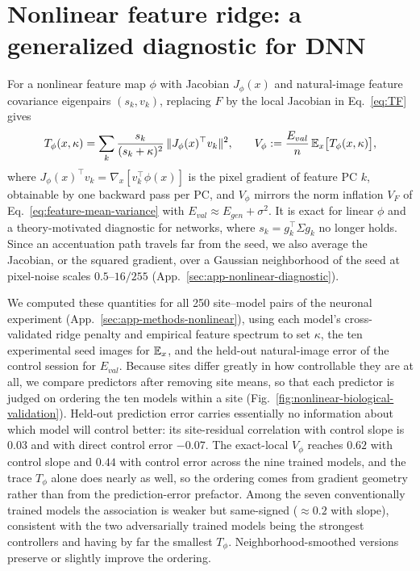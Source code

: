 \section{Nonlinear feature ridge: a generalized diagnostic for DNN}
\label{sec:nonlinear}
For a nonlinear feature map $\phi$ with Jacobian $J_\phi(x)$ and natural-image feature covariance eigenpairs $(s_k,v_k)$, replacing $F$ by the local Jacobian in Eq.~\ref{eq:TF} gives
\vspace{-5pt}
\begin{equation}\small
T_\phi(x,\kappa)=\sum_k\frac{s_k}{(s_k+\kappa)^2}\,\|J_\phi(x)^\top v_k\|^2,
\qquad
V_\phi:=\frac{E_{val}}{n}\,\mathbb{E}_x\big[T_\phi(x,\kappa)\big],
\label{eq:Tphi}
\end{equation}
\vspace{-2pt}
where $J_\phi(x)^\top v_k=\nabla_x[v_k^\top\phi(x)]$ is the pixel gradient of feature PC $k$, obtainable by one backward pass per PC, and $V_\phi$ mirrors the norm inflation $V_F$ of Eq.~\ref{eq:feature-mean-variance} with $E_{val}\approx E_{gen}+\sigma^2$. It is exact for linear $\phi$ and a theory-motivated diagnostic for networks, where $s_k=g_k^\top\Sigma g_k$ no longer holds. Since an accentuation path travels far from the seed, we also average the Jacobian, or the squared gradient, over a Gaussian neighborhood of the seed at pixel-noise scales $0.5$--$16/255$ (App.~\ref{sec:app-nonlinear-diagnostic}).

We computed these quantities for all 250 site--model pairs of the neuronal experiment (App.~\ref{sec:app-methods-nonlinear}), using each model's cross-validated ridge penalty and empirical feature spectrum to set $\kappa$, the ten experimental seed images for $\mathbb{E}_x$, and the held-out natural-image error of the control session for $E_{val}$. Because sites differ greatly in how controllable they are at all, we compare predictors after removing site means, so that each predictor is judged on ordering the ten models within a site (Fig.~\ref{fig:nonlinear-biological-validation}). Held-out prediction error carries essentially no information about which model will control better: its site-residual correlation with control slope is $0.03$ and with direct control error $-0.07$. The exact-local $V_\phi$ reaches $0.62$ with control slope and $0.44$ with control error across the nine trained models, and the trace $T_\phi$ alone does nearly as well, so the ordering comes from gradient geometry rather than from the prediction-error prefactor. Among the seven conventionally trained models the association is weaker but same-signed ($\approx0.2$ with slope), consistent with the two adversarially trained models being the strongest controllers and having by far the smallest $T_\phi$. Neighborhood-smoothed versions preserve or slightly improve the ordering.


